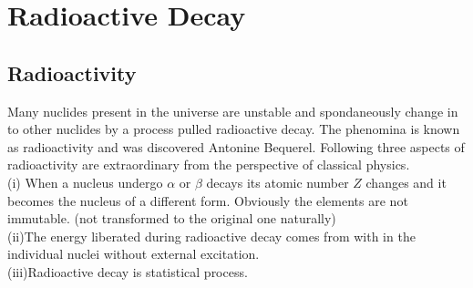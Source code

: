 \chapter{Radioactive Decay}
\section{Radioactivity}
Many nuclides present in the universe are unstable and spondaneously change in to other nuclides by a process pulled radioactive decay. The phenomina is known as radioactivity and was discovered Antonine Bequerel. Following three aspects of radioactivity are extraordinary from the perspective of classical physics.\\
(i) \quad When a nucleus undergo $\alpha$ or $\beta$ decays its atomic number $Z$ changes and it becomes the nucleus of a different form. Obviously the elements are not immutable. (not transformed to the original one naturally)\\
(ii)\quad The energy liberated during radioactive decay comes from with in the individual nuclei without external excitation.\\
(iii)\quad Radioactive decay is statistical process.
